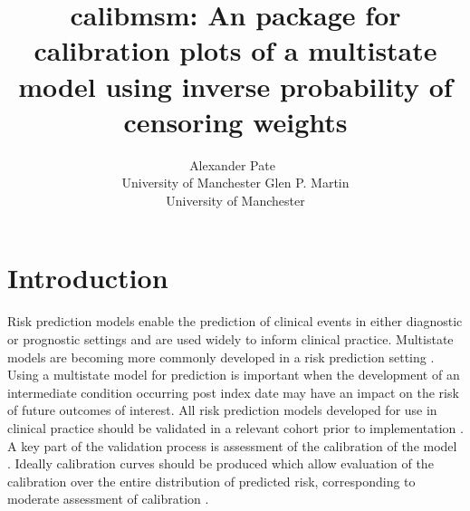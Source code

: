 \documentclass[nojss]{jss}
\author{Alexander Pate~\orcidlink{0000-0002-0849-3458}\\University of Manchester
  \And Glen P. Martin\\University of Manchester}
\title{calibmsm: An \proglang{R} package for calibration plots of a multistate model using inverse probability of censoring weights}
\begin{document}


\section[Introduction]{Introduction} \label{sec:intro}

%

Risk prediction models enable the prediction of clinical events in either diagnostic or prognostic settings \citep{VanSmeden2021} and are used widely to inform clinical practice. Multistate models are becoming more commonly developed in a risk prediction setting \citep{Putter2006, Le-Rademacher2018, Lintu2022, Masia2017}. Using a multistate model for prediction is important when the development of an intermediate condition occurring post index date may have an impact on the risk of future outcomes of interest. All risk prediction models developed for use in clinical practice should be validated in a relevant cohort prior to implementation \citep{Steyerberg2016, Sperrin2022}. A key part of the validation process is assessment of the calibration of the model \citep{VanCalster2019}. Ideally calibration curves should be produced which allow evaluation of the calibration over the entire distribution of predicted risk, corresponding to moderate assessment of calibration \citep{VanCalster2016}.
\end{document}
